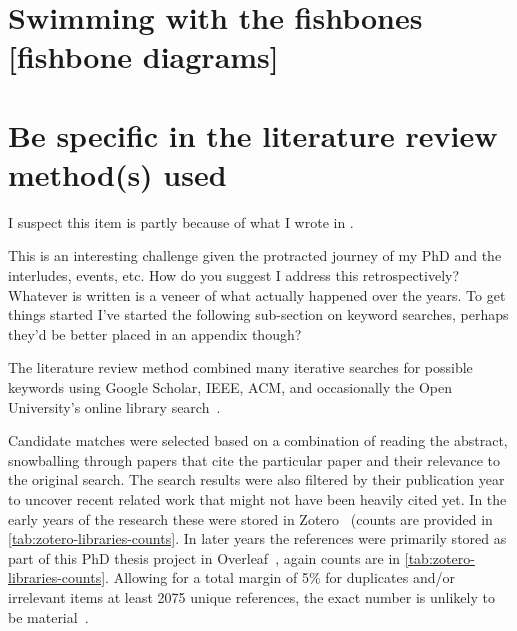 \section{Swimming with the fishbones [fishbone diagrams]}

\section{Be specific in the literature review method(s) used}
\begin{kaobox}

    I suspect this item is partly because of what I wrote in .
    
    This is an interesting challenge given the protracted journey of my PhD and the interludes, events, etc. How do you suggest I address this retrospectively? Whatever is written is a veneer of what actually happened over the years. To get things started I've started the following sub-section on keyword searches, perhaps they'd be better placed in an appendix though?
\end{kaobox}

The literature review method combined many iterative searches for possible keywords using Google Scholar, IEEE, ACM, and occasionally the Open University's online library search~. 

Candidate matches were selected based on a combination of reading the abstract, snowballing through papers that cite the particular paper and their relevance to the original search. The search results were also filtered by their publication year to uncover recent related work that might not have been heavily cited yet. In the early years of the research these were stored in Zotero~ (counts are provided in \ref{tab:zotero-libraries-counts}. In later years the references were primarily stored as part of this PhD thesis project in Overleaf~, again counts are in \ref{tab:zotero-libraries-counts}. Allowing for a total margin of 5\% for duplicates and/or irrelevant items at least 2075 unique references, the exact number is unlikely to be material~.

